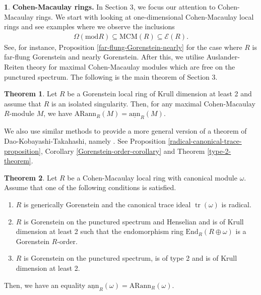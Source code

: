 \documentclass[12pt]{amsart}
\newcommand{\End}{\mathrm{End}}
\newcommand{\sann}{\underline{\mathrm{ann}}}
\newcommand{\arann}{\mathrm{ARann}}
\newcommand{\module}{\mathrm{mod}}
\newcommand{\MCM}{\mathrm{MCM}}
\newcommand{\EE}{\mathcal{E}}
\theoremstyle{definition}
\newtheorem{chunk}[theorem]{}
\newtheorem{introtheorem}{Theorem}
\numberwithin{equation}{theorem}
\DeclareMathOperator{\tr}{\mathrm{tr}}
\begin{document}
\begin{chunk}
    \textbf{Cohen-Macaulay rings.} In Section 3, we focus our attention to Cohen-Macaulay rings. We start with looking at one-dimensional Cohen-Macaulay local rings and see examples where we observe the inclusions 
    \begin{align*}
    \Omega(\module R) \subseteq \MCM(R) \subseteq \EE(R).
    \end{align*}
    See, for instance, Proposition \ref{far-flung-Gorenstein-nearly} for the case where $R$ is far-flung Gorenstein and nearly Gorenstein. After this, we utilise Auslander-Reiten theory for maximal Cohen-Macaulay modules which are free on the punctured spectrum. The following is the main theorem of Section 3.
    
    \begin{introtheorem}
        Let $R$ be a Gorenstein local ring of Krull dimension at least 2 and assume that $R$ is an isolated singularity. Then, for any maximal Cohen-Macaulay $R$-module $M$, we have $\arann_R(M) = \sann_R(M)$.
    \end{introtheorem}

    We also use similar methods to provide a more general version of a theorem of Dao-Kobayashi-Takahashi, namely \cite[Theorem 4.4]{Dao-Kobayashi-Takahashi}. See Proposition \ref{radical-canonical-trace-proposition}, Corollary \ref{Gorenstein-order-corollary} and Theorem \ref{type-2-theorem}.

    \begin{introtheorem}
        Let $R$ be a Cohen-Macaulay local ring with canonical module $\omega$. Assume that one of the following conditions is satisfied.
        \begin{enumerate}
            \item $R$ is generically Gorenstein and the canonical trace ideal $\tr(\omega)$ is radical.
            \item $R$ is Gorenstein on the punctured spectrum and Henselian and is of Krull dimension at least 2 such that the endomorphism ring $\End_R(R \oplus \omega)$ is a Gorenstein $R$-order.
            \item $R$ is Gorenstein on the punctured spectrum, is of type 2 and is of Krull dimension at least 2.
        \end{enumerate}
        Then, we have an equality $\sann_R(\omega) = \arann_R(\omega)$. 
    \end{introtheorem}
\end{chunk}
 
\end{document}
